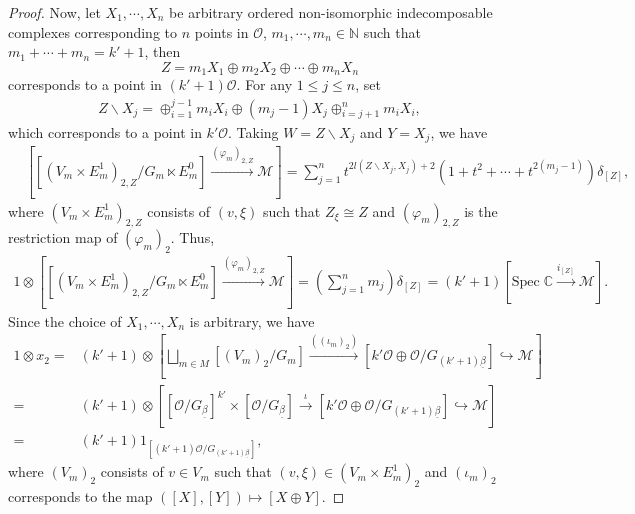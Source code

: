 \documentclass[12pt]{amsart}
\theoremstyle{definition}
\numberwithin{equation}{section}
\begin{document}
\begin{proof}
     Now, let $ X_1, \cdots, X_n $ be arbitrary ordered non-isomorphic indecomposable complexes corresponding to $ n $ points in $ \mathcal{O} $, $ m_1, \cdots, m_n \in \mathbb{N} $ such that $ m_1 + \cdots + m
    _n = k'+1 $, then
    \[Z = m_1 X_1 \oplus m_2 X_2 \oplus\cdots \oplus m_n X_n \]
    corresponds to a point in $ (k'+1)\mathcal{O} $. 
    For any $ 1 \leqslant j \leqslant n $, set
    \begin{align*}
        Z \backslash X_j = \oplus_{i=1}^{j-1} m_i X_i \oplus (m_j-1)X_j \oplus_{i=j+1}^{n} m_i X_i,
    \end{align*}
    which corresponds to a point in $ k' \mathcal{O} $. 
    Taking $ W= Z\backslash X_j $ and $ Y = X_j $, we have
    \begin{align*}
        &[[(V_m \times E_m^1)_{2,Z}/G_m \ltimes E_m^0] \xrightarrow{(\varphi_m)_{2,Z}} \mathcal{M}] = \sum_{j=1}^n t^{2l(Z \backslash X_j,X_j)+2}(1+t^2+\cdots +t^{2(m_j-1)}) \delta_{[Z]},
    \end{align*}
    where $ (V_m \times E_m^1)_{2,Z} $ consists of $ (v,\xi) $ such that $ Z_{\xi} \cong Z $ and $ (\varphi_m)_{2,Z} $ is the restriction map of $ (\varphi_m)_2 $.
    Thus,
    \begin{align*}
        1 \otimes [[(V_m \times E_m^1)_{2,Z}/G_m \ltimes E_m^0] \xrightarrow{(\varphi_m)_{2,Z}} \mathcal{M}] = (\sum_{j=1}^n m_j)\delta_{[Z]}  = (k'+1)[\mathrm{Spec}\;\mathbb{C} \xrightarrow{i_{[Z]}} \mathcal{M}] .
    \end{align*}
    Since the choice of $ X_1, \cdots, X_n $ is arbitrary, we have
    \begin{align*}
        1 \otimes x_2 =& (k'+1)\otimes  [\bigsqcup_{m \in M}[(V_m)_{2}/G_m]\xrightarrow{((\iota_m)_{2})} [k'\mathcal{O}\oplus\mathcal{O}/G_{(k'+1)\underline{\beta}}]\hookrightarrow \mathcal{M}] \\
        =& (k'+1) \otimes [[\mathcal{O}/G_{\underline{\beta}}]^{k'} \times [\mathcal{O}/G_{\underline{\beta}}] \xrightarrow{\iota}[k'\mathcal{O}\oplus\mathcal{O}/G_{(k'+1)\underline{\beta}}]\hookrightarrow \mathcal{M}] \\
        =& (k' + 1)1_{[(k'+1)\mathcal{O}/G_{(k'+1)\underline{\beta}}]},
    \end{align*}
    where $ (V_m)_2 $ consists of $ v \in V_m $ such that $ (v,\xi) \in (V_m \times E_m^1)_2 $ and $ (\iota_m)_2 $ corresponds to the map $ ([X],[Y]) \mapsto [X \oplus Y] $.
    
    
\end{proof}
\end{document}
